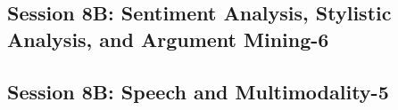\subsection{\large Session 8B: Sentiment Analysis, Stylistic Analysis, and Argument Mining-6}
\label{parallel-session-8B-trackH}
\TrackHLoc\hfill\sessionchair{}{}
\clearpage
\subsection{\large Session 8B: Speech and Multimodality-5}
\label{parallel-session-8B-trackI}
\TrackILoc\hfill\sessionchair{}{}
\clearpage


